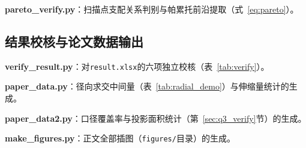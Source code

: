 \documentclass[withoutpreface]{cumcmthesis}
\begin{document}
\textbf{pareto\_verify.py}：扫描点支配关系判别与帕累托前沿提取（式~\eqref{eq:pareto}）。



\subsection{结果校核与论文数据输出}

\textbf{verify\_result.py}：对\texttt{result.xlsx}的六项独立校核（表~\ref{tab:verify}）。



\textbf{paper\_data.py}：径向求交中间量（表~\ref{tab:radial_demo}）与伸缩量统计的生成。



\textbf{paper\_data2.py}：口径覆盖率与投影面积统计（第~\ref{sec:q3_verify}节）的生成。



\textbf{make\_figures.py}：正文全部插图（\texttt{figures/}目录）的生成。


\end{document}
